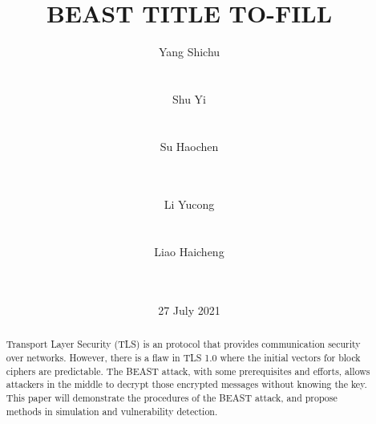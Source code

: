 \documentclass{acm_proc_article-sp}
\begin{document}
\title{
BEAST TITLE TO-FILL
}
\author{
\alignauthor
Yang Shichu\\
       \\
       \\
\alignauthor
Shu Yi\\
       \\
       \\
\alignauthor
Su Haochen\\
       \\
       \\
\and
\alignauthor
Li Yucong\\
       \\
       \\
\alignauthor
Liao Haicheng\\
       \\
       \\
}
\date{27 July 2021}
\maketitle
\begin{abstract}
Transport Layer Security (TLS) is an protocol that provides communication
security over networks. However, there is a flaw in TLS 1.0 where the initial
vectors for block ciphers are predictable. The BEAST attack, with some
prerequisites and efforts, allows attackers in the middle to decrypt those
encrypted messages without knowing the key.
This paper will demonstrate the procedures of the BEAST attack, and propose
methods in simulation and vulnerability detection.
\end{abstract}



\end{document}
